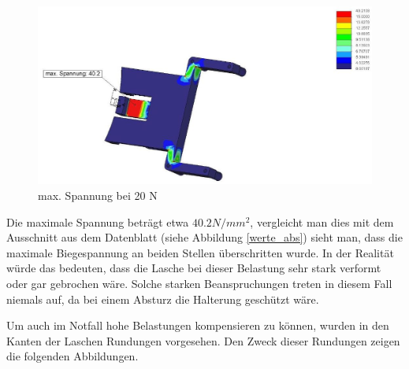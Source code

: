 			\begin{figure}[H]
			\begin{centering}
			\includegraphics[width = 1.1\textwidth]{Bilder/max_spannung_f20_r0_5_oben}
			\par\end{centering}
			\caption{max. Spannung bei 20 N}
			\label{max_spannung_f20_r0_5_oben}
			\end{figure}


	Die maximale Spannung beträgt etwa $40.2 N/mm^{2}$, vergleicht man dies mit dem Ausschnitt aus dem Datenblatt (siehe Abbildung \ref{werte_abs}) sieht man,
	dass die maximale Biegespannung an beiden Stellen überschritten wurde. In der Realität würde das bedeuten, dass die Lasche bei dieser Belastung sehr stark verformt oder gar gebrochen wäre.
	Solche starken Beanspruchungen treten in diesem Fall niemals auf, da  bei einem Absturz die Halterung geschützt wäre.

	Um auch im Notfall hohe Belastungen kompensieren zu können, wurden in den Kanten der Laschen Rundungen vorgesehen. Den Zweck dieser Rundungen zeigen die folgenden Abbildungen.

